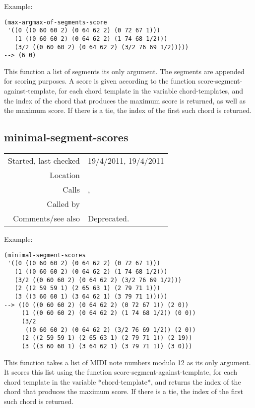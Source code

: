 \vspace{0.5cm}
\noindent Example:
\begin{verbatim}
(max-argmax-of-segments-score
 '((0 ((0 60 60 2) (0 64 62 2) (0 72 67 1)))
   (1 ((0 60 60 2) (0 64 62 2) (1 74 68 1/2)))
   (3/2 ((0 60 60 2) (0 64 62 2) (3/2 76 69 1/2)))))
--> (6 0)
\end{verbatim}

\noindent This function a list of segments its only
argument. The segments are appended for scoring
purposes. A score is given according to the function
score-segment-against-template, for each chord
template in the variable chord-templates, and the
index of the chord that produces the maximum score is
returned, as well as the maximum score. If there is a
tie, the index of the first such chord is returned.


\subsection*{minimal-segment-scores}\label{fun:minimal-segment-scores}

\vspace{0.3cm}
\begin{tabular}{r|p{8cm}}
Started, last checked & 19/4/2011, 19/4/2011 \\
Location & \nameref{sec:chord-labelling} \\
Calls & \nameref{fun:max-argmax-of-segment-scores},\newline \nameref{fun:nth-list-of-lists} \\
Called by &  \\
Comments/see also & Deprecated.
\end{tabular}

\vspace{0.5cm}
\noindent Example:
\begin{verbatim}
(minimal-segment-scores
 '((0 ((0 60 60 2) (0 64 62 2) (0 72 67 1)))
   (1 ((0 60 60 2) (0 64 62 2) (1 74 68 1/2)))
   (3/2 ((0 60 60 2) (0 64 62 2) (3/2 76 69 1/2)))
   (2 ((2 59 59 1) (2 65 63 1) (2 79 71 1)))
   (3 ((3 60 60 1) (3 64 62 1) (3 79 71 1)))))
--> ((0 ((0 60 60 2) (0 64 62 2) (0 72 67 1)) (2 0))
     (1 ((0 60 60 2) (0 64 62 2) (1 74 68 1/2)) (0 0))
     (3/2
      ((0 60 60 2) (0 64 62 2) (3/2 76 69 1/2)) (2 0))
     (2 ((2 59 59 1) (2 65 63 1) (2 79 71 1)) (2 19))
     (3 ((3 60 60 1) (3 64 62 1) (3 79 71 1)) (3 0)))
\end{verbatim}

\noindent This function takes a list of MIDI note
numbers modulo 12 as its only argument. It scores this
list using the function
score-segment-against-template, for each chord
template in the variable *chord-template*, and returns
the index of the chord that produces the maximum
score. If there is a tie, the index of the first such
chord is returned.


